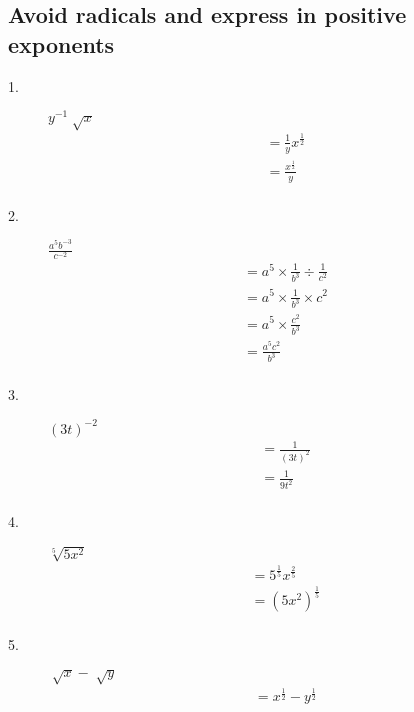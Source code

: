 \documentclass{article}
\begin{document}
\subsection*{Avoid radicals and express in positive exponents}
\begin{description}
    \item[1.] $y^{-1}\sqrt[]{x}$
        $$
            \begin{aligned}
                 & = \frac{1}{y} x^{\frac{1}{2}} \\
                 & = \frac{x^\frac{1}{2}}{y}     \\
            \end{aligned}
        $$
    \item[2.] $\frac{a^5b^{-3}}{c^{-2}}$
        $$
            \begin{aligned}
                 & = a^5 \times \frac{1}{b^{3}} \div \frac{1}{c^2} \\
                 & = a^5 \times \frac{1}{b^{3}} \times c^2         \\
                 & = a^5 \times \frac{c^2}{b^3}                    \\
                 & = \frac{a^5c^2}{b^3}                            \\
            \end{aligned}
        $$
    \item[3.] $(3t)^{-2}$
        $$
            \begin{aligned}
                 & = \frac{1}{(3t)^2} \\
                 & = \frac{1}{9t^2}   \\
            \end{aligned}
        $$
    \item[4.] $\sqrt[5]{5x^2}$
        $$
            \begin{aligned}
                 & = 5^\frac{1}{5}x^\frac{2}{5} \\
                 & = (5x^2)^\frac{1}{5}         \\
            \end{aligned}
        $$
    \item[5.] $\sqrt[]{x}-\sqrt[]{y}$
        $$
            \begin{aligned}
                 & = x^\frac{1}{2}-y^\frac{1}{2} \\
            \end{aligned}
        $$
\end{description}
\end{document}
